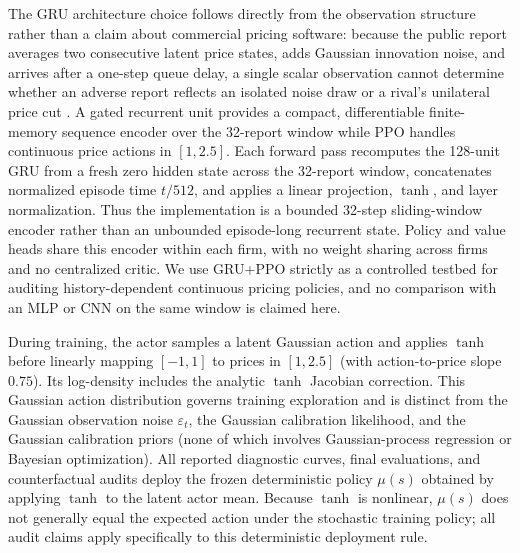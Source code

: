 \documentclass{article}
\begin{document}
The GRU architecture choice follows directly from the observation structure rather than a claim about commercial pricing software: because the public report averages two consecutive latent price states, adds Gaussian innovation noise, and arrives after a one-step queue delay, a single scalar observation cannot determine whether an adverse report reflects an isolated noise draw or a rival's unilateral price cut \citep{green1984noncooperative, calvano2021algorithmic}. A gated recurrent unit \citep{cho2014gru} provides a compact, differentiable finite-memory sequence encoder over the 32-report window while PPO handles continuous price actions in $[1,2.5]$. Each forward pass recomputes the 128-unit GRU from a fresh zero hidden state across the 32-report window, concatenates normalized episode time $t/512$, and applies a linear projection, $\tanh$, and layer normalization. Thus the implementation is a bounded 32-step sliding-window encoder rather than an unbounded episode-long recurrent state. Policy and value heads share this encoder within each firm, with no weight sharing across firms and no centralized critic. We use GRU+PPO strictly as a controlled testbed for auditing history-dependent continuous pricing policies, and no comparison with an MLP or CNN on the same window is claimed here.

During training, the actor samples a latent Gaussian action and applies $\tanh$ before linearly mapping $[-1,1]$ to prices in $[1,2.5]$ (with action-to-price slope $0.75$). Its log-density includes the analytic $\tanh$ Jacobian correction. This Gaussian action distribution governs training exploration and is distinct from the Gaussian observation noise $\varepsilon_t$, the Gaussian calibration likelihood, and the Gaussian calibration priors (none of which involves Gaussian-process regression or Bayesian optimization). All reported diagnostic curves, final evaluations, and counterfactual audits deploy the frozen deterministic policy $\mu(s)$ obtained by applying $\tanh$ to the latent actor mean. Because $\tanh$ is nonlinear, $\mu(s)$ does not generally equal the expected action under the stochastic training policy; all audit claims apply specifically to this deterministic deployment rule.
\end{document}
